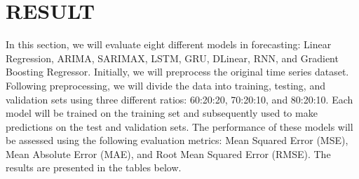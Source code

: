 \documentclass{ieeeojies}
\begin{document}
\section{RESULT}
In this section, we will evaluate eight different models in forecasting: Linear Regression, ARIMA, SARIMAX, LSTM, GRU, DLinear, RNN, and Gradient Boosting Regressor. Initially, we will preprocess the original time series dataset. Following preprocessing, we will divide the data into training, testing, and validation sets using three different ratios: 60:20:20, 70:20:10, and 80:20:10. Each model will be trained on the training set and subsequently used to make predictions on the test and validation sets. The performance of these models will be assessed using the following evaluation metrics: Mean Squared Error (MSE), Mean Absolute Error (MAE), and Root Mean Squared Error (RMSE). The results are presented in the tables below.
\end{document}
